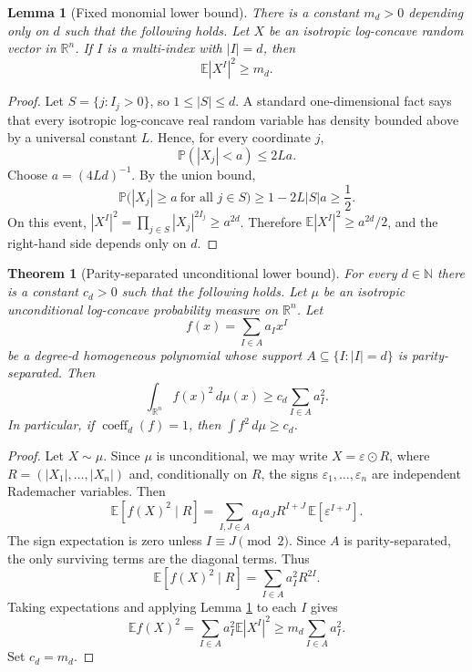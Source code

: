 \documentclass[11pt]{article}
\newtheorem{theorem}{Theorem}
\newtheorem{lemma}{Lemma}
\newcommand{\R}{\mathbb R}
\newcommand{\E}{\mathbb E}
\newcommand{\Pp}{\mathbb P}
\begin{document}
\begin{lemma}[Fixed monomial lower bound]
\label{lem:monomial}
There is a constant $m_d>0$ depending only on $d$ such that the following holds.
Let $X$ be an isotropic log-concave random vector in $\R^n$.  If $I$ is a
multi-index with $|I|=d$, then
\[
  \E |X^I|^2 \geq m_d .
\]
\end{lemma}

\begin{proof}
Let $S=\{j:I_j>0\}$, so $1\leq |S|\leq d$.  A standard one-dimensional fact says
that every isotropic log-concave real random variable has density bounded above
by a universal constant $L$.  Hence, for every coordinate $j$,
\[
  \Pp(|X_j|<a)\leq 2La .
\]
Choose $a=(4Ld)^{-1}$.  By the union bound,
\[
  \Pp\bigl(|X_j|\geq a\ \text{for all }j\in S\bigr)
  \geq 1-2L|S|a \geq \frac12 .
\]
On this event, $|X^I|^2=\prod_{j\in S}|X_j|^{2I_j}\geq a^{2d}$.  Therefore
$\E |X^I|^2\geq a^{2d}/2$, and the right-hand side depends only on $d$.
\end{proof}

\begin{theorem}[Parity-separated unconditional lower bound]
\label{thm:main}
For every $d\in\mathbb N$ there is a constant $c_d>0$ such that the following
holds.  Let $\mu$ be an isotropic unconditional log-concave probability measure
on $\R^n$.  Let
\[
  f(x)=\sum_{I\in A} a_I x^I
\]
be a degree-$d$ homogeneous polynomial whose support $A\subseteq\{I:|I|=d\}$ is
parity-separated.  Then
\[
  \int_{\R^n} f(x)^2\,d\mu(x)
  \geq c_d\sum_{I\in A}a_I^2 .
\]
In particular, if $\operatorname{coeff}_d(f)=1$, then
$\int f^2\,d\mu\geq c_d$.
\end{theorem}

\begin{proof}
Let $X\sim\mu$.  Since $\mu$ is unconditional, we may write
$X=\varepsilon\odot R$, where $R=(|X_1|,\ldots,|X_n|)$ and, conditionally on
$R$, the signs $\varepsilon_1,\ldots,\varepsilon_n$ are independent Rademacher
variables.  Then
\[
  \E\left[f(X)^2\mid R\right]
  =
  \sum_{I,J\in A} a_Ia_J R^{I+J}\,
       \E\left[\varepsilon^{I+J}\right].
\]
The sign expectation is zero unless $I\equiv J\pmod 2$.  Since $A$ is
parity-separated, the only surviving terms are the diagonal terms.  Thus
\[
  \E\left[f(X)^2\mid R\right]
  =
  \sum_{I\in A}a_I^2 R^{2I}.
\]
Taking expectations and applying Lemma \ref{lem:monomial} to each $I$ gives
\[
  \E f(X)^2
  =
  \sum_{I\in A}a_I^2\E |X^I|^2
  \geq
  m_d\sum_{I\in A}a_I^2 .
\]
Set $c_d=m_d$.
\end{proof}
\end{document}
